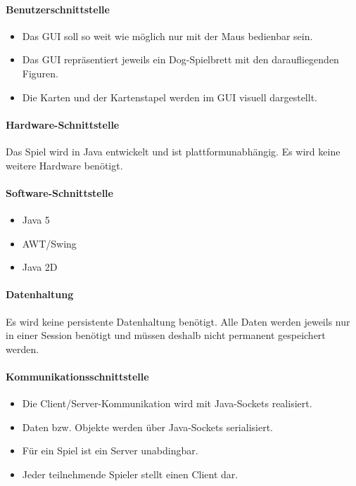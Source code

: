 \documentclass[12pt,halfparskip]{scrartcl}
\begin{document}
\paragraph{Benutzerschnittstelle}\label{ssub:benutzerschnittstelle} %
\begin{itemize}
	\item Das GUI soll so weit wie möglich nur mit der Maus bedienbar sein.
	\item Das GUI repräsentiert jeweils ein Dog-Spielbrett mit den daraufliegenden Figuren.
	\item Die Karten und der Kartenstapel werden im GUI visuell dargestellt.
\end{itemize}
\paragraph{Hardware-Schnittstelle}\label{ssub:hardware_schnittstelle} %
Das Spiel wird in Java entwickelt und ist plattformunabhängig. Es wird keine weitere Hardware benötigt.
\paragraph{Software-Schnittstelle}\label{ssub:software_schnittstelle} %
\begin{itemize}
	\item Java 5
	\item AWT/Swing
	\item Java 2D
\end{itemize}
\paragraph{Datenhaltung}\label{ssub:datenhaltung} %
Es wird keine persistente Datenhaltung benötigt. Alle Daten werden jeweils nur in einer Session benötigt und müssen deshalb nicht permanent gespeichert werden.
\paragraph{Kommunikationsschnittstelle}\label{ssub:kommunikationsschnittstelle} %
\begin{itemize}
	\item Die Client/Server-Kommunikation wird mit Java-Sockets realisiert.
	\item Daten bzw. Objekte werden über Java-Sockets serialisiert.
	\item Für ein Spiel ist ein Server unabdingbar.
	\item Jeder teilnehmende Spieler stellt einen Client dar.
\end{itemize}
\end{document}
